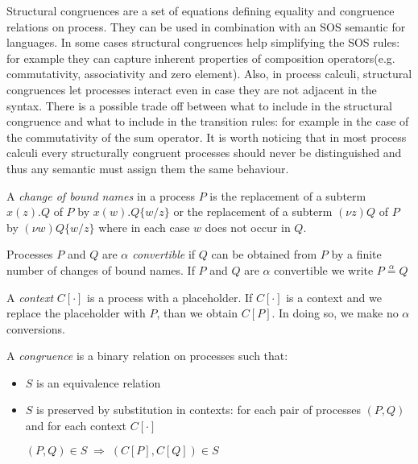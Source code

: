 Structural congruences are a set of equations defining equality and congruence relations on process. They can be used in combination with an SOS semantic for languages. In some cases structural congruences help simplifying the SOS rules: for example they can capture inherent properties of composition operators(e.g. commutativity, associativity and zero element). Also, in process calculi, structural congruences let processes interact even in case they are not adjacent in the syntax. There is a possible trade off between what to include in the structural congruence and what to include in the transition rules: for example in the case of the commutativity of the sum operator. It is worth noticing that in most process calculi every structurally congruent processes should never be distinguished and thus any semantic must assign them the same behaviour.

\begin{definition}
  A \emph{change of bound names} in a process $P$ is the replacement of a subterm $x(z).Q$ of $P$ by $x(w).Q\{w/z\}$ or the replacement of a subterm $(\nu z)Q$ of $P$ by $(\nu w)Q\{w/z\}$ where in each case $w$ does not occur in $Q$.
\end{definition}

\begin{definition}
  Processes $P$ and $Q$ are \emph{$\alpha$ convertible} if $Q$ can be obtained from $P$ by a finite number of changes of bound names. If $P$ and $Q$ are $\alpha$ convertible we write $P\stackrel{\alpha}{=}Q$
\end{definition}


\begin{definition}
  A \emph{context} $C[\cdot]$ is a process with a placeholder. If $C[\cdot]$ is a context and we replace the placeholder with $P$, than we obtain $C[P]$. In doing so, we make no $\alpha$ conversions.
\end{definition}


\begin{definition}
  A \emph{congruence} is a binary relation on processes such that:
  \begin{itemize}
    \item 
      $S$ is an equivalence relation
    \item 
      $S$ is preserved by substitution in contexts: for each pair of processes $(P, Q)$ and for each context $C[\cdot]$
      \begin{center}
	$(P,Q)\in S\; \Rightarrow\; (C[P], C[Q])\in S$
      \end{center}
  \end{itemize}
\end{definition}

